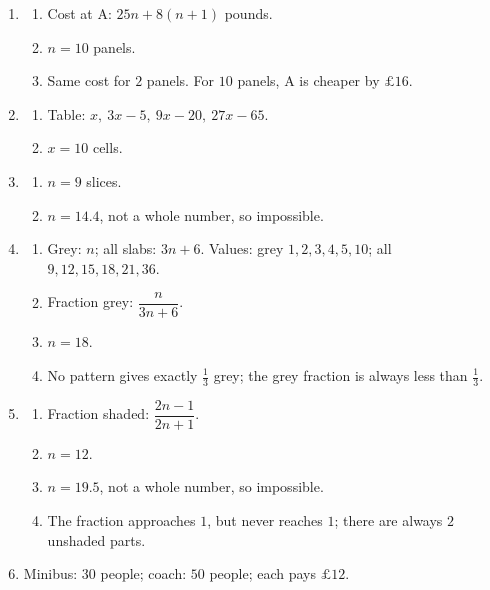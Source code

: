 \documentclass[11pt,a4paper]{article}
\begin{document}
\begin{enumerate}[leftmargin=*,label=\textbf{Q\arabic*.}]
\item
\begin{enumerate}[label=(\alph*)]
\item Cost at A: \(25n+8(n+1)\) pounds.
\item \(n=10\) panels.
\item Same cost for \(2\) panels. For \(10\) panels, A is cheaper by \(\pounds16\).
\end{enumerate}

\item
\begin{enumerate}[label=(\alph*)]
\item Table: \(x,\ 3x-5,\ 9x-20,\ 27x-65\).
\item \(x=10\) cells.
\end{enumerate}

\item
\begin{enumerate}[label=(\alph*)]
\item \(n=9\) slices.
\item \(n=14.4\), not a whole number, so impossible.
\end{enumerate}

\item
\begin{enumerate}[label=(\alph*)]
\item Grey: \(n\); all slabs: \(3n+6\). Values: grey \(1,2,3,4,5,10\); all \(9,12,15,18,21,36\).
\item Fraction grey: \(\dfrac{n}{3n+6}\).
\item \(n=18\).
\item No pattern gives exactly \(\frac13\) grey; the grey fraction is always less than \(\frac13\).
\end{enumerate}

\item
\begin{enumerate}[label=(\alph*)]
\item Fraction shaded: \(\dfrac{2n-1}{2n+1}\).
\item \(n=12\).
\item \(n=19.5\), not a whole number, so impossible.
\item The fraction approaches \(1\), but never reaches \(1\); there are always \(2\) unshaded parts.
\end{enumerate}

\item Minibus: \(30\) people; coach: \(50\) people; each pays \(\pounds12\).


\end{enumerate}
\end{document}
